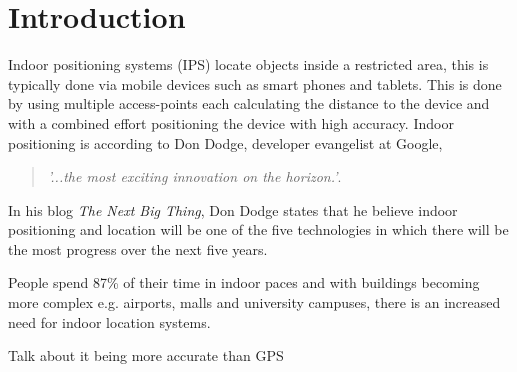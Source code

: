 \chapter{Introduction}
Indoor positioning systems (IPS) locate objects inside a restricted area, this is typically done via mobile devices such as smart phones and tablets. This is done by using multiple access-points each calculating the distance to the device and with a combined effort positioning the device with high accuracy\cite{WhatIsIPS}. 
Indoor positioning is according to Don Dodge, developer evangelist at Google, 
\begin{quotation}
	\textit{'...the most exciting innovation on the horizon.'}\cite{DonDNextBigThing}.
\end{quotation}

In his blog \textit{The Next Big Thing}, Don Dodge states that he believe indoor positioning and location will be one of the five technologies in which there will be the most progress over the next five years\cite{DonDIndoorIsNext}.

People spend 87\% of their time in indoor paces and with buildings becoming more complex e.g. airports, malls and university campuses, there is an increased need for indoor location systems.

Talk about it being more accurate than GPS
